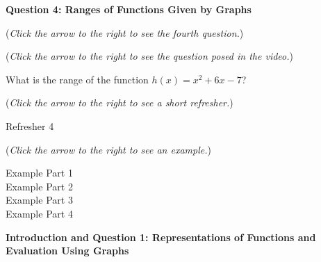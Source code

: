 \documentclass{ximera}
\begin{document}
\textbf{Question 4: Ranges of Functions Given by Graphs}
\begin{question}
\begin{flushright}
{\color{blue}(\emph{Click the arrow to the right to see the fourth question.})}
\end{flushright}
\begin{center}
\begin{expandable}
{\color{blue}(\emph{Click the arrow to the right to see the  question
posed in the video.})}
\begin{expandable}
What is the range of the function $h(x)= x^2+6x -7$?
\begin{multipleChoice}
\choice{$[1,7]$}
\choice{$[0,\infty)$}
\choice{$[-7,\infty)$}
\choice[correct]{$[-16,\infty)$}
\end{multipleChoice}
\begin{flushright}
{\color{blue}(\emph{Click the arrow to the right to see a short refresher.})}
\end{flushright}
\begin{expandable}
Refresher 4
\end{expandable}
\begin{flushright}
{\color{blue}(\emph{Click the arrow to the right to see an example.})}
\end{flushright}
\begin{expandable}
Example Part 1
\\

Example Part 2
\\

Example Part 3
\\

Example Part 4
\end{expandable}
\end{expandable}
\end{expandable}
\end{center}
\end{question}





\textbf{Introduction and Question 1: Representations of 
Functions and Evaluation Using Graphs}
\end{document}
